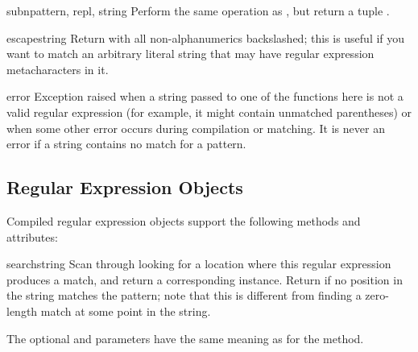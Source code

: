 \begin{funcdesc}{subn}{pattern, repl, string}
  Perform the same operation as , but return a tuple
  .
\end{funcdesc}

\begin{funcdesc}{escape}{string}
  Return  with all non-alphanumerics backslashed; this is
  useful if you want to match an arbitrary literal string that may have
  regular expression metacharacters in it.
\end{funcdesc}

\begin{excdesc}{error}
  Exception raised when a string passed to one of the functions here
  is not a valid regular expression (for example, it might contain
  unmatched parentheses) or when some other error occurs during
  compilation or matching.  It is never an error if a string contains
  no match for a pattern.
\end{excdesc}


\subsection{Regular Expression Objects \label{re-objects}}

Compiled regular expression objects support the following methods and
attributes:

\begin{methoddesc}[RegexObject]{search}{string}
  Scan through  looking for a location where this regular
  expression produces a match, and return a
  corresponding  instance.  Return  if no
  position in the string matches the pattern; note that this is
  different from finding a zero-length match at some point in the string.

  The optional  and  parameters have the same
  meaning as for the  method.
\end{methoddesc}

